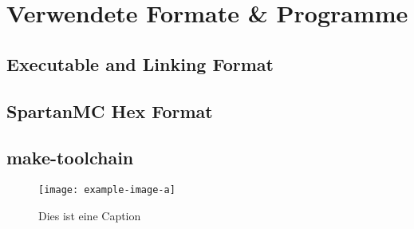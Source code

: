 \chapter{Verwendete Formate \& Programme}

\section{Executable and Linking Format}

\section{SpartanMC Hex Format}

\section{make-toolchain}

\begin{figure}[h] 
\centering
\texttt{[image: example-image-a]}
\caption{Dies ist eine Caption}
\label{fig:example_image}
\end{figure}